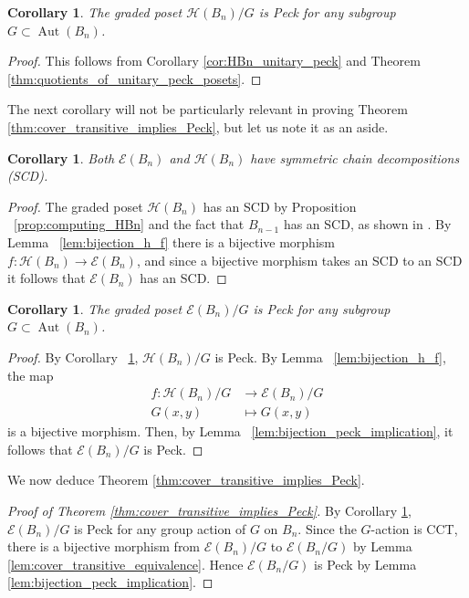 \documentclass[smallextended, envcountsame, numbook]{svjour3}
\theoremstyle{plain}
\newtheorem{cor}[thm]{Corollary}
\theoremstyle{definition}
\theoremstyle{remark}
\numberwithin{equation}{section}
\newcommand\Aut{\operatorname{Aut}}
\begin{document}
\begin{cor}\label{cor:quotients_of_HBn_peck}
The graded poset $\mathcal H(B_n)/G$ is Peck for any subgroup $G\subset \Aut(B_n)$.
\end{cor}

\begin{proof}
This follows from Corollary \ref{cor:HBn_unitary_peck} and Theorem \ref{thm:quotients_of_unitary_peck_posets}.
\end{proof}

The next corollary will not be particularly relevant in proving Theorem \ref{thm:cover_transitive_implies_Peck}, but let us note it as an aside.

\begin{cor}
Both $\mathcal{E}(B_n)$ and $\mathcal H(B_n)$ have symmetric chain decompositions (SCD).
\end{cor}


\begin{proof}
The graded poset
$\mathcal{H}(B_n)$ has an SCD by Proposition ~\ref{prop:computing_HBn} and the fact that $B_{n-1}$ has an SCD, as shown in \cite{greene}.  By Lemma ~\ref{lem:bijection_h_f} there is a bijective morphism $f\colon\mathcal{H}(B_n)\rightarrow\mathcal{E}(B_n)$, and since a bijective morphism takes an SCD to an SCD it follows that $\mathcal{E}(B_n)$ has an SCD.
\end{proof}


\begin{cor}
\label{cor:quotiented_edge_peck}
The graded poset $\mathcal E(B_n)/G$ is Peck for any subgroup $G\subset \Aut(B_n)$.
\end{cor}
\begin{proof}
By Corollary ~\ref{cor:quotients_of_HBn_peck}, $\mathcal H(B_n)/G$ is Peck. By Lemma ~\ref{lem:bijection_h_f}, the map 
\begin{align*}
f\colon\mathcal H(B_n)/G &\rightarrow \mathcal E(B_n)/G \\
G(x, y) &\mapsto G(x, y)
\end{align*}
 is a bijective morphism. Then, by Lemma ~\ref{lem:bijection_peck_implication}, it follows that $\mathcal E(B_n)/G$ is Peck.
\end{proof}

We now deduce Theorem \ref{thm:cover_transitive_implies_Peck}.

\begin{proof}[Proof of Theorem \ref{thm:cover_transitive_implies_Peck}]
By Corollary \ref{cor:quotiented_edge_peck}, $\mathcal{E}(B_n)/G$ is Peck for any group action of $G$ on $B_n$. Since the $G$-action is CCT, there is a bijective morphism from $\mathcal{E}(B_n)/G$ to $\mathcal{E}(B_n/G)$ by Lemma \ref{lem:cover_transitive_equivalence}. Hence $\mathcal{E}(B_n/G)$ is Peck by Lemma \ref{lem:bijection_peck_implication}.
\end{proof}
\end{document}
